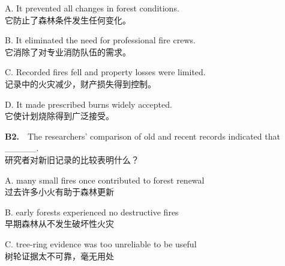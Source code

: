 \documentclass[a4paper,11pt,openany]{report}
\newcommand{\zhline}[1]{{\CJKsf\color{bodygrey}#1}}
\begin{document}
\begin{samepage}
A. It prevented all changes in forest conditions.\\
\zhline{它防止了森林条件发生任何变化。}
\par\end{samepage}

\begin{samepage}
B. It eliminated the need for professional fire crews.\\
\zhline{它消除了对专业消防队伍的需求。}
\par\end{samepage}

\begin{samepage}
C. Recorded fires fell and property losses were limited.\\
\zhline{记录中的火灾减少，财产损失得到控制。}
\par\end{samepage}

\begin{samepage}
D. It made prescribed burns widely accepted.\\
\zhline{它使计划烧除得到广泛接受。}
\par\end{samepage}

\begin{samepage}
\textbf{B2.}　The researchers' comparison of old and recent records indicated that \_\_\_\_\_.\\
\zhline{研究者对新旧记录的比较表明什么？}
\par\end{samepage}

\begin{samepage}
A. many small fires once contributed to forest renewal\\
\zhline{过去许多小火有助于森林更新}
\par\end{samepage}

\begin{samepage}
B. early forests experienced no destructive fires\\
\zhline{早期森林从不发生破坏性火灾}
\par\end{samepage}

\begin{samepage}
C. tree-ring evidence was too unreliable to be useful\\
\zhline{树轮证据太不可靠，毫无用处}
\par\end{samepage}
\end{document}
